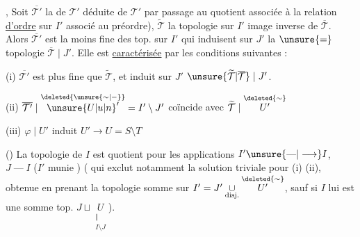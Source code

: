 ,  Soit $\overline{\mathcal{T}'}$  la  de $\mathcal{T}'$ déduite de $\mathcal{T}'$ par passage au quotient  associée à la relation \uline{d'ordre} sur $I'$ associé au préordre), $\widetilde{\mathcal{T}}$ la topologie sur $I'$ image inverse de $\overline{\mathcal{T}}$. Alors $\overline{\mathcal{T}'}$ est la moins fine des top. sur $I'$ qui  induisent sur $J'$ la $\unsure{=}$  topologie $\overline{\mathcal{T}}\mid J'$. Elle est
\uline{caractérisée} par les conditions suivantes :

(i) $\overline{\mathcal{T}'}$ est plus fine que $\widetilde{\mathcal{T}}$, et induit sur $J'$ $\unsure{\widetilde{\mathcal{T}}|\overline{\mathcal{T}}}\mid J'$.

(ii) $\overline{\mathcal{T}'}\mid\overset{\deleted{\unsure{\sim|\mathord{-}}}}{{\unsure{U|u|n}}'}=I'\setminus J'$ coïncide avec $\widetilde{\mathcal{T}}\mid\overset{\deleted{\sim}}{U'}$

(iii) $\varphi\mid U'$ induit   $U'\longrightarrow U=S\setminus T$

() La topologie de $I$ est quotient  pour les applications $I'\unsure{\mathbin{\text{---}}|\longrightarrow}I$, $J\mathbin{\text{---}}I$ ($I'$ munie  ) ( qui exclut notamment la solution triviale pour (i) (ii), obtenue en prenant la topologie somme sur  $I'=J'\underset{\text{disj.}}{\cup}\overset{\deleted{\sim}}{U'}$, sauf si $I$ lui\unsure{$=$} est une somme top. $J\sqcup\underset{\substack{\Vert\\I\setminus J}}{U}$).

